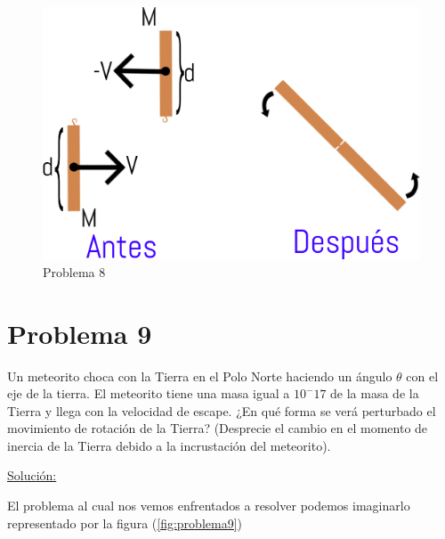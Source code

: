 \documentclass[a4paper,10pt]{article}
\numberwithin{equation}{section}
\begin{document}
\begin{figure}[ht]
 \centering
\includegraphics[scale=0.4]{problema8fig1}
\caption{Problema 8}
\label{fig:problema8}
\end{figure}


\vspace{.3cm}

\section{Problema 9}

Un meteorito choca con la Tierra en el Polo Norte haciendo un ángulo $\theta$ con
el eje de la tierra. El meteorito tiene una masa igual a $10^-17$ de la masa de la 
Tierra y llega con la velocidad de escape. ¿En qué forma se verá perturbado el movimiento
de rotación de la Tierra? (Desprecie el cambio en el momento de inercia de la Tierra
debido a la incrustación del meteorito).
\vspace{.3cm}

\underline{Solución:}\vspace{.3cm}

El problema al cual nos vemos enfrentados a resolver podemos imaginarlo representado
por la figura (\ref{fig:problema9})
\end{document}

